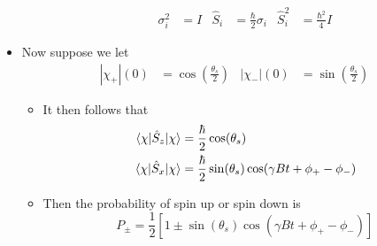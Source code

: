 \documentclass[../notes.tex]{subfiles}
\begin{document}
\begin{itemize}
\begin{itemize}
\begin{align*}
            \sigma_i^2 &= I&
            \hat{S}_i &= \frac{\hbar}{2}\sigma_i&
            \hat{S}_i^2 &= \frac{\hbar^2}{4}I
        \end{align*}
    \end{itemize}
    \item Now suppose we let
    \begin{align*}
        |\chi_+|(0) &= \cos(\frac{\theta_s}{2})&
        |\chi_-|(0) &= \sin(\frac{\theta_s}{2})
    \end{align*}
    \begin{itemize}
        \item It then follows that
        \begin{align*}
            \ev{\hat{S}_z}{\chi} &= \frac{\hbar}{2}\cos(\theta_s)\\
            \ev{\hat{S}_x}{\chi} &= \frac{\hbar}{2}\sin(\theta_s)\cos(\gamma Bt+\phi_+-\phi_-)
        \end{align*}
        \item Then the probability of spin up or spin down is
        \begin{equation*}
            P_\pm = \frac{1}{2}[1\pm\sin(\theta_s)\cos(\gamma Bt+\phi_+-\phi_-)]
        \end{equation*}
    \end{itemize}
\end{itemize}
\end{document}
